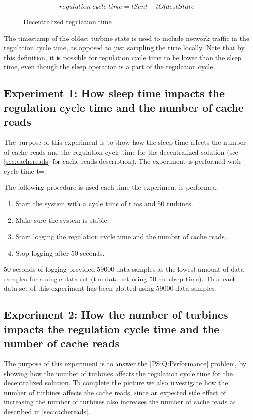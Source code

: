 $$regulation~cycle~time=tSent-tOldestState$$

\begin{figure}[b]
	
	\caption{Decentralized regulation time}
	\label{fig:timingDecentral}
\end{figure}

The timestamp of the oldest turbine state is used to include network traffic in the regulation cycle time, as opposed to just sampling the time locally. Note that by this definition, it is possible for regulation cycle time to be lower than the sleep time, even though the sleep operation is a part of the regulation cycle. 


\subsection{Experiment 1: How sleep time impacts the regulation cycle time and the number of cache reads}
\label{subsec:Exper:perfom:1}
The purpose of this experiment is to show how the sleep time affects the number of cache reads and the regulation cycle time for the decentralized solution (see \cref{sec:cachereads} for cache reads description).  
The experiment is performed with cycle time t=\testCycletimeNumbers.  

The following procedure is used each time the experiment is performed:
\begin{enumerate}
	\item Start the system with a cycle time of t ms and 50 turbines.
	\item Make sure the system is stable.
	\item Start logging the regulation cycle time and the number of cache reads.
	\item Stop logging after 50 seconds.
\end{enumerate}

50 seconds of logging provided 59000 data samples as the lowest amount of data samples for a single data set (the data set using 50 ms sleep time). Thus each data set of this experiment has been plotted using 59000 data samples.

\subsection{Experiment 2: How the number of turbines impacts the regulation cycle time and the number of cache reads}
\label{subsec:Exper:perfom:2}
The purpose of this experiment is to answer the \ref{PS:Q:Performance} problem, by showing how the number of turbines affects the regulation cycle time for the decentralized solution. To complete the picture we also investigate how the number of turbines affects the cache reads, since an expected side effect of increasing the number of turbines also increases the number of cache reads as described in \cref{sec:cachereads}.

